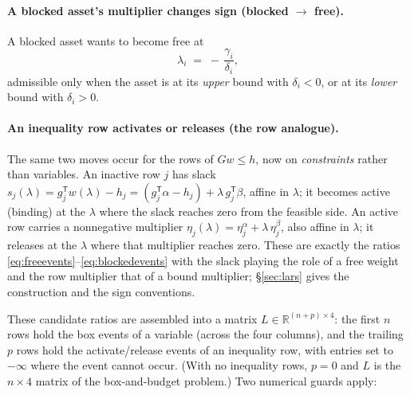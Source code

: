\documentclass[11pt]{article}
\newcommand{\R}{\mathbb{R}}
\newcommand{\trans}{^{\mathsf{T}}}
\begin{document}
\paragraph{A blocked asset's multiplier changes sign (blocked $\to$ free).}
A blocked asset wants to become free at
\begin{equation}
\label{eq:blockedevents}
\lambda_i \;=\; -\,\frac{\gamma_i}{\delta_i},
\end{equation}
admissible only when the asset is at its \emph{upper} bound with $\delta_i < 0$, or at
its \emph{lower} bound with $\delta_i > 0$.

\paragraph{An inequality row activates or releases (the row analogue).}
The same two moves occur for the rows of $G w \le h$, now on \emph{constraints} rather
than variables. An inactive row $j$ has slack
$s_j(\lambda) = g_j\trans w(\lambda) - h_j = (g_j\trans\alpha - h_j) + \lambda\,
g_j\trans\beta$, affine in $\lambda$; it becomes active (binding) at the $\lambda$ where
the slack reaches zero from the feasible side. An active row carries a nonnegative
multiplier $\eta_j(\lambda) = \eta_j^{\alpha} + \lambda\,\eta_j^{\beta}$, also affine in
$\lambda$; it releases at the $\lambda$ where that multiplier reaches zero. These are
exactly the ratios \eqref{eq:freeevents}--\eqref{eq:blockedevents} with the slack
playing the role of a free weight and the row multiplier that of a bound multiplier;
\S\ref{sec:lars} gives the construction and the sign conventions.

These candidate ratios are assembled into a matrix $L\in\R^{(n+p)\times 4}$: the first
$n$ rows hold the box events of a variable (across the four columns), and the trailing
$p$ rows hold the activate/release events of an inequality row, with entries set to
$-\infty$ where the event cannot occur. (With no inequality rows, $p=0$ and $L$ is the
$n\times 4$ matrix of the box-and-budget problem.) Two numerical guards apply:
\end{document}
